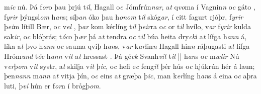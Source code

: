 m\textit{ic} nú. Þá f\textit{or}o  þau þrjú t\textit{il}, Hagall
o\textit{c} Jómfrún\textit{n}\textit{ar}, a\textit{t} q\textit{vo}ma   í Vagnin\textit{n} o\textit{c} gáto  , f\textit{yrir} þýngsl\textit{om} h\textit{an}s; síþ\textit{an} óko þau
h\textit{onom} t\textit{il} skóg\textit{ar}, í eitt fagurt
rjóþr,   f\textit{yrir} þ\textit{ei}m lítill  Bær, o\textit{c}
v\textit{el} , þ\textit{ar} kom   kérlíng   t\textit{il} þ\textit{eir}ra  o\textit{c}  or   t\textit{il} hvílo, v\textit{ar}  
  f\textit{yrir} kulda sak\textit{ir}, o\textit{c} blóþrás; 
t\textit{óc}o þ\textit{ær} þá a\textit{t} tendra   o\textit{c} t\textit{il} búa heita dry\textit{ck}i a\textit{t} lífga  h\textit{ann} á, líka a\textit{t} þvo h\textit{ann} o\textit{c}
sauma qviþ h\textit{an}s, v\textit{ar}  k\textit{ar}lin\textit{n} Hagall hin\textit{n}  ráþugasti   a\textit{t} lífga Hróm\textit{und} t\textit{óc} h\textit{ann}  v\textit{it} a\textit{t} hressast   . Þá gé\textit{ck} Svanh\textit{vít} t\textit{il} || h\textit{an}s o\textit{c} m\textit{ælir} Nú v\textit{er}þ\textit{om}
v\textit{it} systr, a\textit{t} skilja v\textit{it} þ\textit{ic},
o\textit{c} hefi e\textit{c} feng\textit{it} þér hús o\textit{c} hjúkrún hér á laun;   þen\textit{n}\textit{an}\textit{n} m\textit{ann} a\textit{t} vitja þín, o\textit{c} eins a\textit{t} græþa þ\textit{ic},   man k\textit{er}líng h\textit{an}s     á eina o\textit{c} aþra luti, þ\textit{ví}  hún er f\textit{or}n í brỏgþ\textit{om}. 
